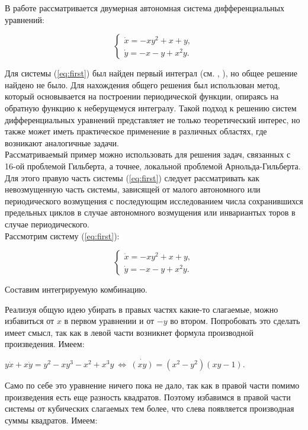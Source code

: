 \documentclass{article}
\begin{document}
В работе рассматривается двумерная автономная система дифференциальных уравнений:

\begin{equation}
\begin{cases}
      \dot x=-xy^2+x+y,\\
      \dot y=-x-y+x^2y.
    \end{cases}
    \label{eq:first}
\end{equation}

Для системы (\ref{eq:first}) был найден первый интеграл (см. \cite{basov}, \cite{engl}), но общее решение найдено не было. Для нахождения общего решения был использован метод, который основывается на построении периодической функции, опираясь на обратную функцию к неберущемуся интегралу. Такой подход к решению систем дифференциальных уравнений представляет не только теоретический интерес, но также может иметь практическое применение в различных областях, где возникают аналогичные задачи.\\

Рассматриваемый пример можно использовать для решения задач, связанных с 16-ой проблемой Гильберта, а точнее, локальной проблемой Арнольда-Гильберта. Для этого правую часть системы (\ref{eq:first}) следует рассматривать как невозмущенную часть системы, зависящей от малого автономного или периодического возмущения с последующим исследованием числа сохранившихся предельных циклов в случае автономного возмущения или инвариантых торов в случае периодического.\\

\medskip 
Рассмотрим систему (\ref{eq:first}):

$$
\begin{cases}
      \dot x=-xy^2+x+y,\\
      \dot y=-x-y+x^2y.
    \end{cases}
$$

Составим интегрируемую комбинацию.

\smallskip
Реализуя общую идею убирать в правых частях какие-то слагаемые, можно избавиться от $x$ в первом уравнении и от $-y$  
во втором. Попробовать это сделать имеет смысл, так как в левой части возникнет формула производной произведения. Имеем:

\smallskip
$y\dot x+x\dot y=y^2-xy^3-x^2+x^3y\ \Leftrightarrow\ \dot{(xy)}=(x^2-y^2)(xy-1).$

\smallskip
Само по себе это уравнение ничего пока не дало, так как в правой части помимо произведения есть еще разность квадратов. 
Поэтому избавимся в правой части системы от кубических слагаемых тем более, что слева появляется производная суммы квадратов. Имеем: 
\end{document}
